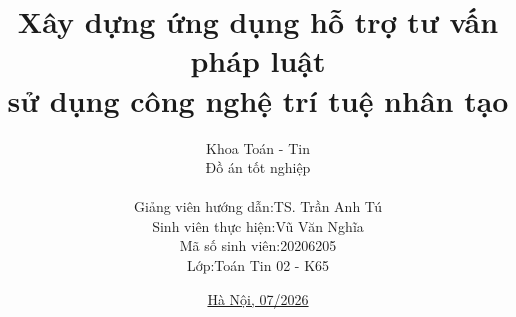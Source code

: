 \documentclass[notheorems,hyperref={bookmarks=true},usepdftitle=false]{beamer}
\title[{\makebox[.15\paperwidth]{Khoa Toán - Tin}}]{Xây dựng ứng dụng hỗ trợ tư vấn pháp luật \\ sử dụng công nghệ trí tuệ nhân tạo}
\author[\href{https://20206205.tech}{Vũ Văn Nghĩa - 20206205}]{
Khoa Toán - Tin \\
Đồ án tốt nghiệp \\[0.2cm]
\begin{tabular}{ll}
Giảng viên hướng dẫn: & TS. Trần Anh Tú \\
Sinh viên thực hiện: & Vũ Văn Nghĩa \\
Mã số sinh viên: & 20206205 \\
Lớp: & Toán Tin 02 - K65
\end{tabular}
}
\date{\href{https://20206205tech.github.io/docs-slide-more}{Hà Nội, 07/2026}}
\theoremstyle{plain}
\numberwithin{equation}{section}
\numberwithin{figure}{section}
\numberwithin{table}{section}
\newif\ifdev
\begin{document}



\ifdev

\fi
\end{document}
